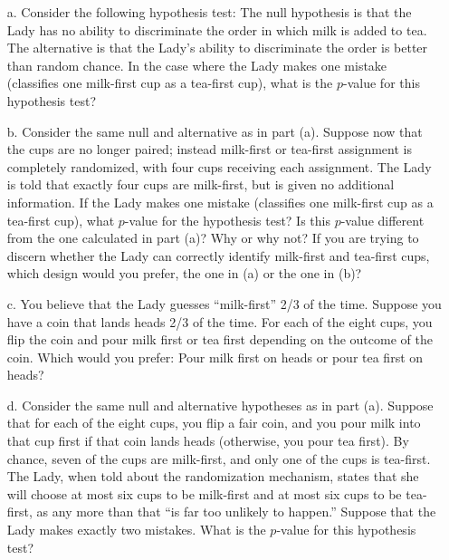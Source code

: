 \documentclass{article}
\begin{document}
\begin{itemize}


\item[a.]   Consider the following hypothesis test:  The null hypothesis 
  is that the Lady has no ability to
  discriminate the order in which milk is added to tea. 
  The alternative is that the Lady's ability to discriminate 
  the order is better than random chance.
  In the case where the Lady makes one mistake (classifies
  one milk-first cup as a tea-first cup), what is the $p$-value for this hypothesis test?

\item[b.] Consider the same null and alternative as in part (a).  
  Suppose now that the cups are no longer paired;
  instead milk-first or tea-first assignment is completely randomized,
  with four cups receiving each assignment. 
  The Lady is told that exactly four cups are milk-first, 
  but is given no additional information.
  If the Lady makes one mistake (classifies one milk-first cup as a tea-first cup), 
  what $p$-value for the hypothesis test?
  Is this $p$-value different from the one calculated in part (a)? 
  Why or why not?
  If you are trying to discern whether the 
  Lady can correctly identify milk-first
  and tea-first cups, which design would you prefer,
  the one in (a) or the one in (b)?

\item[c.]  You believe that the Lady guesses ``milk-first'' 2/3 of the time.  
  Suppose you have a coin that
  lands heads 2/3 of the time.  
  For each of the eight cups, you flip the coin and pour
  milk first or tea first depending on the outcome of the coin.
  Which would you prefer:  
  Pour milk first on heads or pour tea first on heads?
  
\item[d.]  
  Consider the same null and alternative hypotheses as in part (a).
  Suppose that for each of the eight cups, you flip a fair coin, 
  and you pour milk into that cup first
  if that coin lands heads (otherwise, you pour tea first).
  By chance, seven of the cups are milk-first, and only one of the cups is tea-first.
  The Lady, when told about the randomization mechanism, 
  states that she will choose at most six cups to be milk-first and at most six cups to 
  be tea-first, as any more than that ``is far too unlikely to happen.''
  Suppose that the Lady makes exactly two mistakes.
  What is the $p$-value for this hypothesis test?

\end{itemize}
\end{document}
